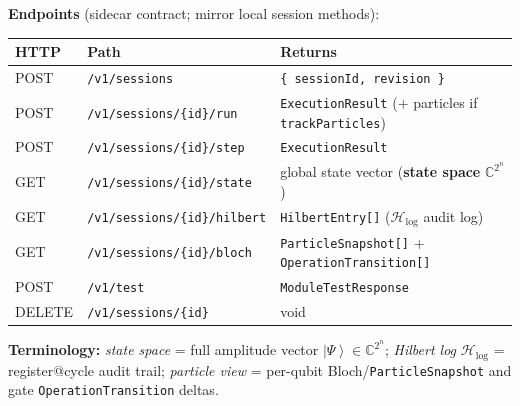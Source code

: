 \documentclass[11pt,a4paper]{article}
\newcommand{\C}{\mathbb{C}}
\newcommand{\ket}[1]{\left|#1\right\rangle}
\newcommand{\HS}{\mathcal{H}_{\mathrm{log}}}
\begin{document}
\textbf{Endpoints} (sidecar contract; mirror local session methods):

\begin{center}
\small
\begin{tabular}{@{}lll@{}}
\toprule
HTTP & Path & Returns \\
\midrule
POST & \texttt{/v1/sessions} & \texttt{\{ sessionId, revision \}} \\
POST & \texttt{/v1/sessions/\{id\}/run} & \texttt{ExecutionResult} (+ particles if \texttt{trackParticles}) \\
POST & \texttt{/v1/sessions/\{id\}/step} & \texttt{ExecutionResult} \\
GET  & \texttt{/v1/sessions/\{id\}/state} & global state vector (\textbf{state space} $\C^{2^n}$) \\
GET  & \texttt{/v1/sessions/\{id\}/hilbert} & \texttt{HilbertEntry[]} ($\HS$ audit log) \\
GET  & \texttt{/v1/sessions/\{id\}/bloch} & \texttt{ParticleSnapshot[]} + \texttt{OperationTransition[]} \\
POST & \texttt{/v1/test} & \texttt{ModuleTestResponse} \\
DELETE & \texttt{/v1/sessions/\{id\}} & void \\
\bottomrule
\end{tabular}
\end{center}

\textbf{Terminology:} \emph{state space} = full amplitude vector $\ket{\Psi}\in\C^{2^n}$; \emph{Hilbert log} $\HS$ = register@cycle audit trail; \emph{particle view} = per-qubit Bloch/\texttt{ParticleSnapshot} and gate \texttt{OperationTransition} deltas.
\end{document}
